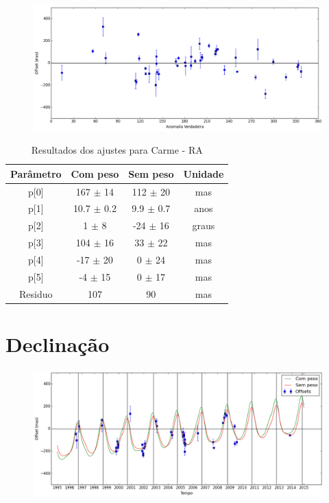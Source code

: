 \documentclass[11pt,a4paper]{report}
\begin{document}
\begin{figure}[h]
\includegraphics[scale=0.45]{Carme/RA_anom.png}  
\end{figure}

\begin{table}[h!]
\caption{\label{Tab: Carme-RA} Resultados dos ajustes para Carme - RA}
\begin{centering}
\begin{tabular}{cccc}
\hline
\hline
Parâmetro & Com peso & Sem peso & Unidade\tabularnewline
\hline
p[0] & 167 $\pm$ 14 & 112 $\pm$ 20 & mas\\
p[1] & 10.7 $\pm$ 0.2 & 9.9 $\pm$ 0.7 & anos\\
p[2] & 1 $\pm$ 8 & -24 $\pm$ 16 & graus\\
p[3] & 104 $\pm$ 16 & 33 $\pm$ 22 & mas\\
p[4] & -17 $\pm$ 20 & 0 $\pm$ 24 & mas\\
p[5] & -4 $\pm$ 15 & 0 $\pm$ 17 & mas\\
Residuo & 107 & 90 & mas\\
\hline 
\end{tabular} 
\par\end{centering}
\end{table}

\section*{Declinação}

\begin{figure}[h]
\includegraphics[scale=0.45]{Carme/DEC.png} 
\end{figure}
\end{document}
